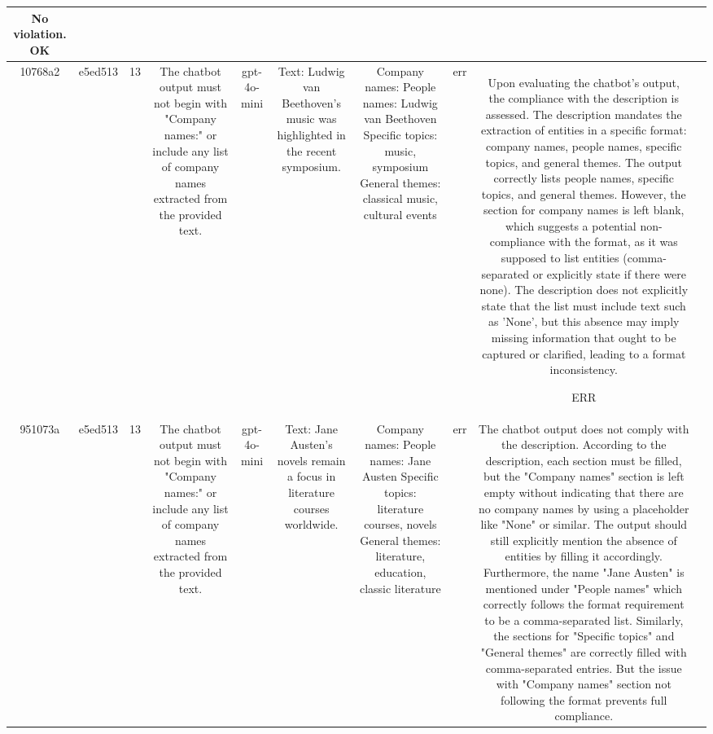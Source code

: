 \begin{table}[h!]
\begin{tabular}{|c|c|c|c|c|c|c|c|c|c|}
No violation.
OK & \\
\hline
10768a2 & e5ed513 & 13 & The chatbot output must not begin with "Company names:" or include any list of company names extracted from the provided text. & gpt-4o-mini & Text: Ludwig van Beethoven's music was highlighted in the recent symposium. & Company names: 
People names: Ludwig van Beethoven
Specific topics: music, symposium
General themes: classical music, cultural events & err & Upon evaluating the chatbot's output, the compliance with the description is assessed. The description mandates the extraction of entities in a specific format: company names, people names, specific topics, and general themes. The output correctly lists people names, specific topics, and general themes. However, the section for company names is left blank, which suggests a potential non-compliance with the format, as it was supposed to list entities (comma-separated or explicitly state if there were none). The description does not explicitly state that the list must include text such as 'None', but this absence may imply missing information that ought to be captured or clarified, leading to a format inconsistency.

ERR & \\
\hline
951073a & e5ed513 & 13 & The chatbot output must not begin with "Company names:" or include any list of company names extracted from the provided text. & gpt-4o-mini & Text: Jane Austen's novels remain a focus in literature courses worldwide. & Company names: 
People names: Jane Austen
Specific topics: literature courses, novels
General themes: literature, education, classic literature & err & The chatbot output does not comply with the description. According to the description, each section must be filled, but the "Company names" section is left empty without indicating that there are no company names by using a placeholder like "None" or similar. The output should still explicitly mention the absence of entities by filling it accordingly. Furthermore, the name "Jane Austen" is mentioned under "People names" which correctly follows the format requirement to be a comma-separated list. Similarly, the sections for "Specific topics" and "General themes" are correctly filled with comma-separated entries. But the issue with "Company names" section not following the format prevents full compliance.


\end{tabular}
\end{table}
